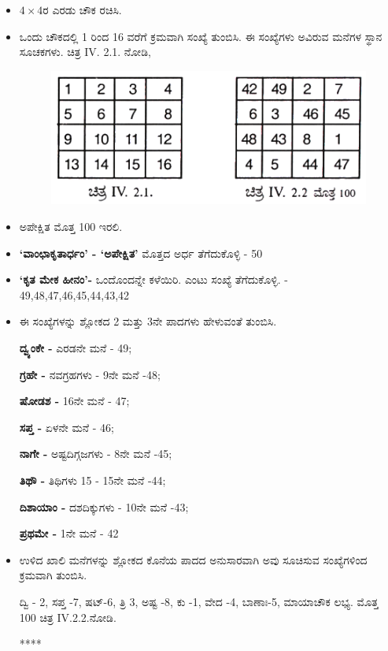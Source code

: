 \begin{itemize}
	\item $4 \times 4$ರ ಎರಡು ಚೌಕ ರಚಿಸಿ.
	\item ಒಂದು ಚೌಕದಲ್ಲಿ 1 ರಿಂದ 16 ವರೆಗೆ ಕ್ರಮವಾಗಿ ಸಂಖ್ಯೆ ತುಂಬಿಸಿ. ಈ ಸಂಖ್ಯೆಗಳು ಅವಿರುವ ಮನೆಗಳ ಸ್ಥಾನ ಸೂಚಕಗಳು. ಚಿತ್ರ IV. 2.1. ನೋಡಿ,
	\begin{figure}[h]
	\includegraphics{src/figures/chap3/fig3.40.jpg}
	\end{figure}
	\item ಅಪೇಕ್ಷಿತ ಮೊತ್ತ 100 ಇರಲಿ.
	\item \textbf{‘ವಾಂಛಾಕೃತಾರ್ಧಂ’ - ‘ಅಪೇಕ್ಷಿತ’} ಮೊತ್ತದ ಅರ್ಧ ತೆಗೆದುಕೊಳ್ಳಿ - 50
	\item \textbf{‘ಕೃತ ಮೇಕ ಹೀನಂ’-} ಒಂದೊಂದನ್ನೇ ಕಳೆಯಿರಿ. ಎಂಟು ಸಂಖ್ಯೆ ತೆಗೆದುಕೊಳ್ಳಿ. - 49,48,47,46,45,44,43,42
	\item ಈ ಸಂಖ್ಯೆಗಳನ್ನು ಶ್ಲೋಕದ 2 ಮತ್ತು 3ನೇ ಪಾದಗಳು ಹೇಳುವಂತೆ ತುಂಬಿಸಿ.

	\textbf{ದ್ವ್ಯಂಕೇ - }ಎರಡನೇ ಮನೆ - 49;

	\textbf{ಗ್ರಹೇ -} ನವಗ್ರಹಗಳು - 9ನೇ ಮನೆ -48;

	\textbf{ಷೋಡಶ -} 16ನೇ ಮನೆ - 47;

	\textbf{ಸಪ್ತ -} ಏಳನೇ ಮನೆ - 46;

	\textbf{ನಾಗೇ -} ಅಷ್ಟದಿಗ್ಗಜಗಳು - 8ನೇ ಮನೆ -45;

	\textbf{ತಿಥೌ -} ತಿಥಿಗಳು 15 - 15ನೇ ಮನೆ -44;

	\textbf{ದಿಶಾಯಾಂ -} ದಶದಿಕ್ಕುಗಳು - 10ನೇ ಮನೆ -43;

	\textbf{ಪ್ರಥಮೇ -} 1ನೇ ಮನೆ - 42

	\item ಉಳಿದ ಖಾಲಿ ಮನೆಗಳನ್ನು ಶ್ಲೋಕದ ಕೊನೆಯ ಪಾದದ ಅನುಸಾರವಾಗಿ ಅವು ಸೂಚಿಸುವ ಸಂಖ್ಯೆಗಳಿಂದ ಕ್ರಮವಾಗಿ ತುಂಬಿಸಿ.

	ದ್ವಿ  - 2, ಸಪ್ತ -7, ಷಟ್-6,  ತ್ರಿ 3, ಅಷ್ಟ -8, ಕು -1, ವೇದ -4, ಬಾಣಾಃ-5, ಮಾಯಾಚೌಕ ಲಭ್ಯ. ಮೊತ್ತ 100 ಚಿತ್ರ IV.2.2.ನೋಡಿ.
	\begin{center}
	****
	\end{center}
\end{itemize}

